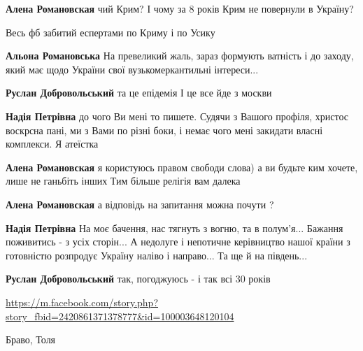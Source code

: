 \begin{itemize}
\begin{itemize}
\textbf{Алена Романовская} чий Крим? І чому за 8 років Крим не повернули в Україну?

Весь фб забитий еспертами по Криму і по Усику

\textbf{Альона Романовська}
На превеликий жаль, зараз формують ватність і до заходу, який має щодо України свої вузькомеркантильні інтереси...

\textbf{Руслан Добровольський} та це епідемія
І це все йде з москви

\textbf{Надія Петрівна} до чого Ви мені то пишете. Судячи з Вашого профіля, христос воскрсна пані, ми з Вами по різні боки, і немає чого мені закидати власні комплекси. Я атеїстка

\textbf{Алена Романовская} я користуюсь правом свободи слова) а ви будьте ким хочете, лише не ганьбіть інших
Тим більше релігія вам далека

\textbf{Алена Романовская} а відповідь на запитання можна почути ?

\textbf{Надія Петрівна}
На моє бачення, нас тягнуть з вогню, та в полум'я...
Бажання поживитись - з усіх сторін...
А недолуге і непотичне керівництво нашої країни з готовністю розпродує Україну наліво і направо...
Та ще й на південь...

\textbf{Руслан Добровольський} так, погоджуюсь - і так всі 30 років

\url{https://m.facebook.com/story.php?story_fbid=2420861371378777&id=100003648120104}

\end{itemize} %


Браво, Толя


\end{itemize} %
